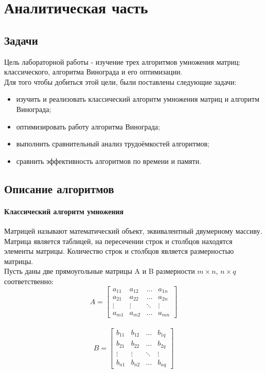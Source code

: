 \documentclass[12pt, a4paper]{report}
\begin{document}
    \chapter{Аналитическая часть}
	\section{Задачи}
	Цель лабораторной работы - изучение трех алгоритмов умножения матриц: классического, алгоритма Винограда и его оптимизации.\\
	Для того чтобы добиться этой цели, были поставлены следующие задачи:
	\begin{itemize}
		\item изучить и реализовать классический алгоритм умножения матриц и алгоритм Винограда;
		\item оптимизировать работу алгоритма Винограда;
		\item выполнить сравнительный анализ трудоёмкостей алгоритмов;
		\item сравнить эффективность алгоритмов по времени и памяти.
	\end{itemize}

	\section{Описание алгоритмов}
	\subsubsection{Классический алгоритм умножения}
	Матрицей называют математический объект, эквивалентный двумерному массиву. Матрица является таблицей, на пересечении строк и столбцов находятся элементы матрицы. Количество строк и столбцов является размерностью матрицы.\\
	Пусть даны две прямоугольные матрицы A и B размерности $m \times n$, $n \times q$
	соответственно:\\
	$$A =  \begin{bmatrix} 
	a_{11}& a_{12} &\ldots & a_{1n}\\ 
	a_{21}& a_{22} &\ldots & a_{2n}\\ 
	\vdots& \vdots &\ddots & \vdots\\ 
	a_{m1}& a_{m2} &\ldots & a_{mn} 
	\end{bmatrix} $$\\	
	
	$$B = \begin{bmatrix} 
	b_{11}& b_{12} &\ldots & b_{1q}\\ 
	b_{21}& b_{22} &\ldots & b_{2q}\\ 
	\vdots& \vdots &\ddots & \vdots\\ 
	b_{n1}& b_{n2} &\ldots & b_{nq} 
	\end{bmatrix} $$\\
	
\end{document}
